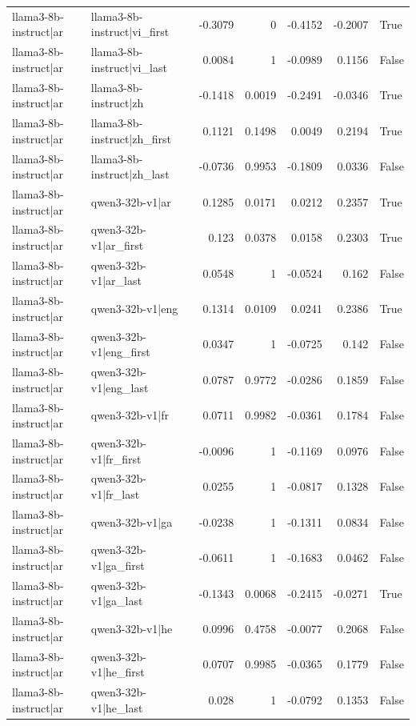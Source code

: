 \begin{table}
\begin{tabular}{l l r r r r l}
llama3-8b-instruct|ar & llama3-8b-instruct|vi_first & -0.3079 & 0 & -0.4152 & -0.2007 & True \\
llama3-8b-instruct|ar & llama3-8b-instruct|vi_last & 0.0084 & 1 & -0.0989 & 0.1156 & False \\
llama3-8b-instruct|ar & llama3-8b-instruct|zh & -0.1418 & 0.0019 & -0.2491 & -0.0346 & True \\
llama3-8b-instruct|ar & llama3-8b-instruct|zh_first & 0.1121 & 0.1498 & 0.0049 & 0.2194 & True \\
llama3-8b-instruct|ar & llama3-8b-instruct|zh_last & -0.0736 & 0.9953 & -0.1809 & 0.0336 & False \\
llama3-8b-instruct|ar & qwen3-32b-v1|ar & 0.1285 & 0.0171 & 0.0212 & 0.2357 & True \\
llama3-8b-instruct|ar & qwen3-32b-v1|ar_first & 0.123 & 0.0378 & 0.0158 & 0.2303 & True \\
llama3-8b-instruct|ar & qwen3-32b-v1|ar_last & 0.0548 & 1 & -0.0524 & 0.162 & False \\
llama3-8b-instruct|ar & qwen3-32b-v1|eng & 0.1314 & 0.0109 & 0.0241 & 0.2386 & True \\
llama3-8b-instruct|ar & qwen3-32b-v1|eng_first & 0.0347 & 1 & -0.0725 & 0.142 & False \\
llama3-8b-instruct|ar & qwen3-32b-v1|eng_last & 0.0787 & 0.9772 & -0.0286 & 0.1859 & False \\
llama3-8b-instruct|ar & qwen3-32b-v1|fr & 0.0711 & 0.9982 & -0.0361 & 0.1784 & False \\
llama3-8b-instruct|ar & qwen3-32b-v1|fr_first & -0.0096 & 1 & -0.1169 & 0.0976 & False \\
llama3-8b-instruct|ar & qwen3-32b-v1|fr_last & 0.0255 & 1 & -0.0817 & 0.1328 & False \\
llama3-8b-instruct|ar & qwen3-32b-v1|ga & -0.0238 & 1 & -0.1311 & 0.0834 & False \\
llama3-8b-instruct|ar & qwen3-32b-v1|ga_first & -0.0611 & 1 & -0.1683 & 0.0462 & False \\
llama3-8b-instruct|ar & qwen3-32b-v1|ga_last & -0.1343 & 0.0068 & -0.2415 & -0.0271 & True \\
llama3-8b-instruct|ar & qwen3-32b-v1|he & 0.0996 & 0.4758 & -0.0077 & 0.2068 & False \\
llama3-8b-instruct|ar & qwen3-32b-v1|he_first & 0.0707 & 0.9985 & -0.0365 & 0.1779 & False \\
llama3-8b-instruct|ar & qwen3-32b-v1|he_last & 0.028 & 1 & -0.0792 & 0.1353 & False \\

\end{tabular}
\end{table}
